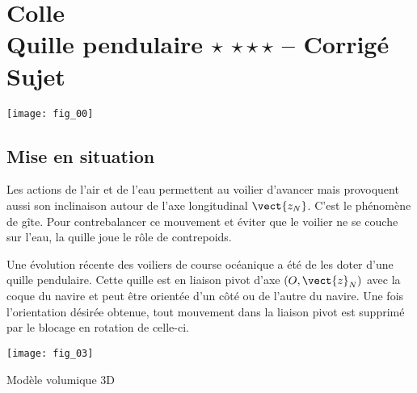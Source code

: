 \chapter*{Colle  \\ 
Quille pendulaire \ifnormal $\star$ \else \fi \iftdifficile $\star\star\star$ \else \fi  -- 
\ifprof Corrigé \else Sujet \fi}

\iflivret {} \else
\ifprof  {} \else \fi
\fi

\setcounter{question}{0}

\begin{marginfigure} [4cm]
\texttt{[image: fig\_00]}
\end{marginfigure}


\section*{Mise en situation}
\ifprof
\else

Les actions de l'air et de l'eau permettent au voilier d'avancer mais provoquent aussi son inclinaison autour de l'axe longitudinal $\vect{z_N}$. C’est le phénomène de gîte. Pour contrebalancer ce mouvement et éviter que le voilier ne se couche sur l’eau, la quille joue le rôle de contrepoids. 



Une évolution récente des voiliers de course océanique a été de les doter d’une quille pendulaire. Cette quille est en liaison pivot d’axe $\left(O,\vect{z}_N \right)$ avec la coque du navire et peut être orientée d’un côté ou de l’autre du navire. Une fois l’orientation désirée obtenue, tout mouvement dans la liaison pivot est supprimé par le blocage en rotation de celle-ci. 

\begin{marginfigure}[-2cm]
\texttt{[image: fig\_03]}

\caption{Modèle volumique 3D}
\end{marginfigure}


